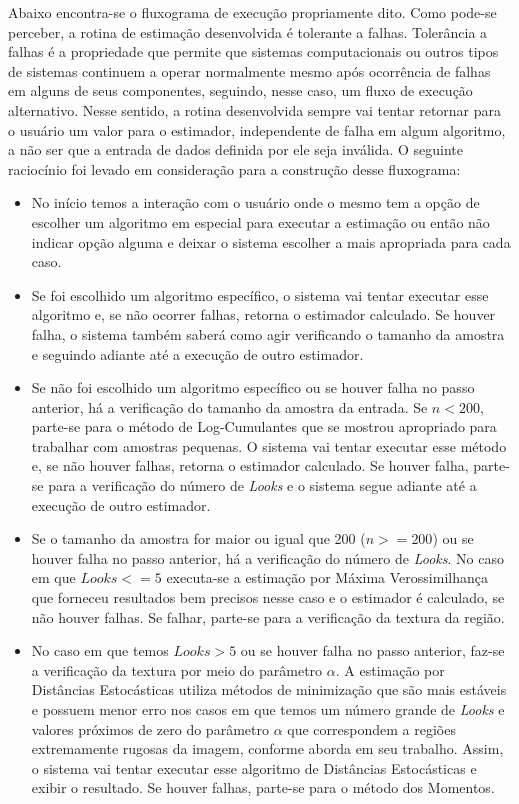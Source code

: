 Abaixo encontra-se o fluxograma de execução propriamente dito. Como pode-se perceber, a rotina de estimação desenvolvida é tolerante a falhas. Tolerância a falhas é a propriedade que permite que sistemas computacionais ou outros tipos de sistemas continuem a operar normalmente mesmo após ocorrência de falhas em alguns de seus componentes, seguindo, nesse caso, um fluxo de execução alternativo. Nesse sentido, a rotina desenvolvida sempre vai tentar retornar para o usuário um valor para o estimador, independente de falha em algum algoritmo, a não ser que a entrada de dados definida por ele seja inválida. O seguinte raciocínio foi levado em consideração para a construção desse fluxograma:
\begin{itemize}
    \item No início temos a interação com o usuário onde o mesmo tem a opção de escolher um algoritmo em especial para executar a estimação ou então não indicar opção alguma e deixar o sistema escolher a mais apropriada para cada caso.
    \item Se foi escolhido um algoritmo específico, o sistema vai tentar executar esse algoritmo e, se não ocorrer falhas, retorna o estimador calculado. Se houver falha, o sistema também saberá como agir verificando o tamanho da amostra e seguindo adiante até a execução de outro estimador.
    \item Se não foi escolhido um algoritmo específico ou se houver falha no passo anterior, há a verificação do tamanho da amostra da entrada. Se $n < 200$, parte-se para o método de Log-Cumulantes que se mostrou apropriado para trabalhar com amostras pequenas. O sistema vai tentar executar esse método e, se não houver falhas, retorna o estimador calculado. Se houver falha, parte-se para a verificação do número de \textit{Looks} e o sistema segue adiante até a execução de outro estimador.
    \item Se o tamanho da amostra for maior ou igual que 200 ($n >= 200$) ou se houver falha no passo anterior, há a verificação do número de \textit{Looks}. No caso em que $Looks <= 5$ executa-se a estimação por Máxima Verossimilhança que forneceu resultados bem precisos nesse caso e o estimador é calculado, se não houver falhas. Se falhar, parte-se para a verificação da textura da região.
    \item No caso em que temos $Looks > 5$ ou se houver falha no passo anterior, faz-se a verificação da textura por meio do parâmetro $\alpha$. A estimação por Distâncias Estocásticas utiliza métodos de minimização que são mais estáveis e possuem menor erro nos casos em que temos um número grande de \textit{Looks} e valores próximos de zero do parâmetro $\alpha$ que correspondem a regiões extremamente rugosas da imagem, conforme aborda \citet{Cassetti2013} em seu trabalho. Assim, o sistema vai tentar executar esse algoritmo de Distâncias Estocásticas e exibir o resultado. Se houver falhas, parte-se para o método dos Momentos. 

\end{itemize}
